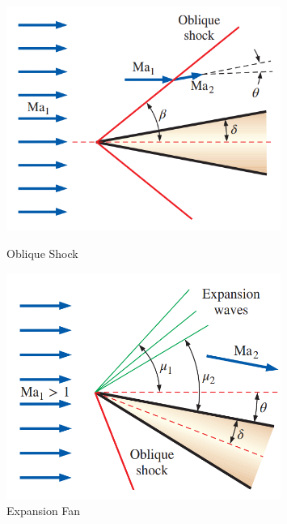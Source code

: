 \begin{figure}[H]
    \centering
    \begin{minipage}{0.11\textwidth}
        \centering
        \includegraphics[width=0.8\textwidth]{Figures/oblique.png}
        \caption*{Oblique Shock}
    \end{minipage}
    \begin{minipage}{0.11\textwidth}
        \centering
        \includegraphics[width=0.8\textwidth]{Figures/expansion fan.png}
        \caption*{Expansion Fan}
    \end{minipage}
\end{figure}
